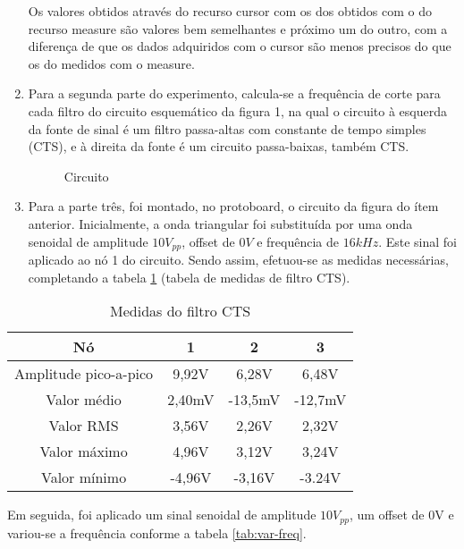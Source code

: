 \documentclass[a4paper]{article} %
\begin{document}
\begin{enumerate}
Os valores obtidos através do recurso cursor com os dos obtidos com o do recurso measure são valores bem semelhantes e próximo um do outro, com a diferença de que os dados adquiridos com o cursor são menos precisos do que os do medidos com o measure.

\item Para a segunda parte do experimento, calcula-se a frequência de corte para cada filtro do circuito esquemático da figura 1, na qual o circuito à esquerda da fonte de sinal é um filtro passa-altas com constante de tempo simples (CTS), e à direita da fonte é um circuito passa-baixas, também CTS. 


\begin{figure}[h]
\centerline{}
\caption{Circuito \label{tab:circ}}
\end{figure}


\item Para a parte três, foi montado, no protoboard, o circuito da figura do ítem anterior. Inicialmente, a onda triangular foi substituída por uma onda senoidal de amplitude $10V_{pp}$, offset de $0V$ e frequência de $16kHz$. Este sinal foi aplicado ao nó 1 do circuito. Sendo assim, efetuou-se as medidas necessárias, completando a tabela \ref{tab:Medidas-do-filtro} (tabela de medidas de filtro CTS).
\end{enumerate}



%
\begin{table}[h]
\begin{centering}
\begin{tabular}{|c|c|c|c|}
\hline 
Nó & 1 & 2 & 3\tabularnewline
\hline
\hline 
Amplitude pico-a-pico & 9,92V  & 6,28V  & 6,48V \tabularnewline
\hline 
Valor médio & 2,40mV & -13,5mV  & -12,7mV \tabularnewline
\hline 
Valor RMS & 3,56V & 2,26V  & 2,32V \tabularnewline
\hline 
Valor máximo & 4,96V & 3,12V  & 3,24V \tabularnewline
\hline 
Valor mínimo & -4,96V  & -3,16V  & -3.24V \tabularnewline
\hline
\end{tabular}
\par\end{centering}

\caption{Medidas do filtro CTS \label{tab:Medidas-do-filtro}}

\end{table}





Em seguida, foi aplicado um sinal senoidal de amplitude $10V_{pp}$, um offset de 0V e variou-se a frequência conforme a tabela \ref{tab:var-freq}. 
\end{document}
